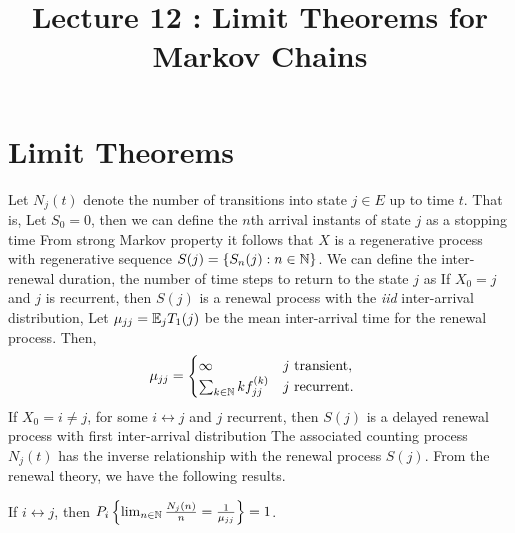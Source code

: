 \documentclass[a4paper,10pt,english]{article}
\title{Lecture 12 : Limit Theorems for Markov Chains}
\author{}
\begin{document}
\maketitle

\section{Limit Theorems}
Let $N_j(t)$ denote the number of transitions into state $j \in E$ up to time $t$. 
That is,
Let $S_0 = 0$, then we can define the $n$th arrival instants of state $j$ as a stopping time 
From strong Markov property it follows that $X$ is a regenerative process with regenerative sequence  
$S(j) = \{S_n(j) : n \in \mathbb{N}\}$. 
We can define the inter-renewal duration, the number of time steps to return to the state $j$ as
If $X_0 = j$ and $j$ is recurrent, then $S(j)$ is a renewal process with the \textit{iid} inter-arrival distribution, 
Let $\mu_{jj} = \mathbb{E}_jT_1(j)$ be the mean inter-arrival time for the renewal process. %
Then, 
 \begin{align*}
 \mu_{jj} &=\begin{cases}
	\infty & j \text{ transient}, \\
	\sum_{k \in \mathbb{N}} k f_{jj}^{(k)} & j \text{ recurrent}.\end{cases}
\end{align*}
If $X_0 = i \neq j$, for some $i \leftrightarrow j$ and $j$ recurrent, then $S(j)$ is a
delayed renewal process with first inter-arrival distribution 
The associated counting process $N_j(t)$ has the inverse relationship with the renewal process $S(j)$. 
From the renewal theory, we have the following results. 

\begin{prop} 
If $i \leftrightarrow j$, then 
$P_i\left\{ \lim_{n \in \mathbb{N}} \frac{N_j(n)}{n}= \frac{1}{\mu_{jj}}\right\} = 1$.
\end{prop}
\end{document}
